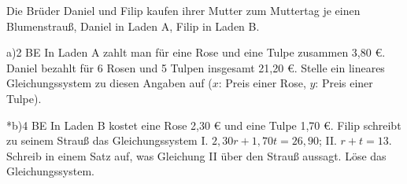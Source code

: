 \documentclass[11pt]{article}
\begin{document}
\begin{pfaufg}{}{}{}
Die Brüder Daniel und Filip kaufen ihrer Mutter zum Muttertag je einen Blumenstrauß, Daniel in Laden A, Filip in Laden B.
\end{pfaufg}
\begin{pfaufg}{}{a)}{2 BE}
In Laden A zahlt man für eine Rose und eine Tulpe zusammen 3,80 €. Daniel bezahlt für 6 Rosen und 5 Tulpen insgesamt 21,20 €. Stelle ein lineares Gleichungssystem zu diesen Angaben auf ($x$: Preis einer Rose, $y$: Preis einer Tulpe).
\par\smallskip\noindent {}\par
{}
\end{pfaufg}
\begin{pfaufg}{}{*b)}{4 BE}
In Laden B kostet eine Rose 2,30 € und eine Tulpe 1,70 €. Filip schreibt zu seinem Strauß das Gleichungssystem I. $2{,}30r + 1{,}70t = 26{,}90$; II. $r + t = 13$. Schreib in einem Satz auf, was Gleichung II über den Strauß aussagt. Löse das Gleichungssystem.
\end{pfaufg}
\end{document}
